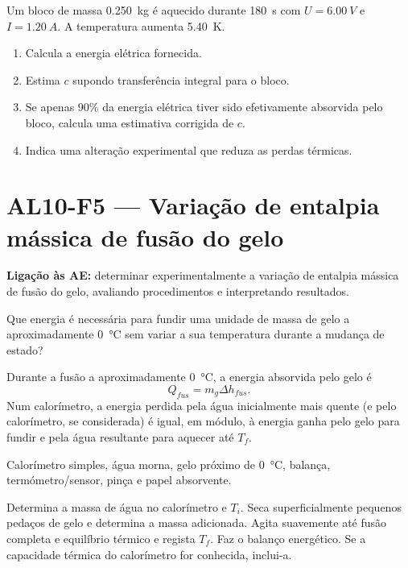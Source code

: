 \documentclass[11pt,a4paper,openany]{book}
\newcounter{exercicio}[chapter]
\renewcommand{\theexercicio}{\thechapter.\arabic{exercicio}}
\newenvironment{exercicio}[1][]%
{\refstepcounter{exercicio}%
\begin{tcolorbox}[breakable,colback=white,colframe=eublue!70,
 title={Exercício \theexercicio\if\relax\detokenize{#1}\relax\else\ --- #1\fi},fonttitle=\bfseries]}%
{\end{tcolorbox}}
\newcommand{\LigAE}[1]{\textbf{Ligação às AE:} #1}
\begin{document}
\begin{exercicio}[Capacidade térmica mássica]
Um bloco de massa \SI{0.250}{kg} é aquecido durante \SI{180}{s} com $U=\SI{6.00}{V}$ e $I=\SI{1.20}{A}$. A temperatura aumenta \SI{5.40}{K}.
\begin{enumerate}[label=\alph*)]
\item Calcula a energia elétrica fornecida.
\item Estima $c$ supondo transferência integral para o bloco.
\item Se apenas $90\%$ da energia elétrica tiver sido efetivamente absorvida pelo bloco, calcula uma estimativa corrigida de $c$.
\item Indica uma alteração experimental que reduza as perdas térmicas.
\end{enumerate}
\end{exercicio}

\section{AL10-F5 — Variação de entalpia mássica de fusão do gelo}
\LigAE{determinar experimentalmente a variação de entalpia mássica de fusão do gelo, avaliando procedimentos e interpretando resultados.}

\begin{questao}
Que energia é necessária para fundir uma unidade de massa de gelo a aproximadamente \SI{0}{\celsius} sem variar a sua temperatura durante a mudança de estado?
\end{questao}

\begin{fundamento}
Durante a fusão a aproximadamente \SI{0}{\celsius}, a energia absorvida pelo gelo é
\[
Q_{fus}=m_g\Delta h_{fus}.
\]
Num calorímetro, a energia perdida pela água inicialmente mais quente (e pelo calorímetro, se considerada) é igual, em módulo, à energia ganha pelo gelo para fundir e pela água resultante para aquecer até $T_f$.
\end{fundamento}

\begin{material}
Calorímetro simples, água morna, gelo próximo de \SI{0}{\celsius}, balança, termómetro/sensor, pinça e papel absorvente.
\end{material}

\begin{metodo}
Determina a massa de água no calorímetro e $T_i$. Seca superficialmente pequenos pedaços de gelo e determina a massa adicionada. Agita suavemente até fusão completa e equilíbrio térmico e regista $T_f$. Faz o balanço energético. Se a capacidade térmica do calorímetro for conhecida, inclui-a.
\end{metodo}
\end{document}
